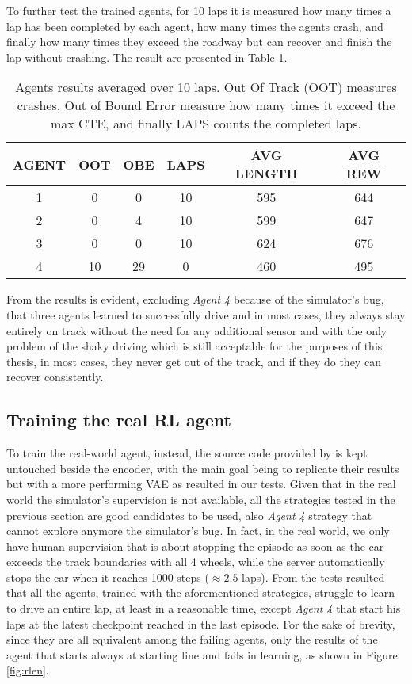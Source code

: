 To further test the trained agents, for 10 laps it is measured how many times a lap has been completed by each agent, how many times the agents crash, and finally how many times they exceed the roadway but can recover and finish the lap without crashing. The result are presented in Table \ref{tab:simagent}.
\begin{table}
  \centering
  \begin{tabular}{|c|c|c|c|c|c|}
  \hline
  AGENT & OOT & OBE & LAPS & AVG LENGTH & AVG REW \\ \hline
  1 & 0 & 0 & 10 & 595 & 644 \\
  2 & 0 & 4 & 10 & 599 & 647  \\ \hline
  3 & 0 & 0 & 10 & 624 & 676 \\
  4 & 10 & 29 & 0 & 460 & 495  \\ \hline
  \end{tabular}
  \caption{Agents results averaged over 10 laps. Out Of Track (OOT) measures crashes, Out of Bound Error measure how many times it exceed the max CTE, and finally LAPS counts the completed laps.}
  \label{tab:simagent}
\end{table}
From the results is evident, excluding \textit{Agent 4} because of the simulator's bug, that three agents learned to successfully drive and in most cases, they always stay entirely on track without the need for any additional sensor and with the only problem of the shaky driving which is still acceptable for the purposes of this thesis, in most cases, they never get out of the track, and if they do they can recover consistently.

\subsection{Training the real RL agent}
To train the real-world agent, instead, the source code provided by \citet{learning-to-drive-in-5-minutes} is kept untouched beside the encoder, with the main goal being to replicate their results but with a more performing VAE as resulted in our tests. Given that in the real world the simulator's supervision is not available, all the strategies tested in the previous section are good candidates to be used, also \textit{Agent 4} strategy that cannot explore anymore the simulator's bug. In fact, in the real world, we only have human supervision that is about stopping the episode as soon as the car exceeds the track boundaries with all 4 wheels, while the server automatically stops the car when it reaches 1000 steps ($\approx 2.5$ laps). From the tests resulted that all the agents, trained with the aforementioned strategies, struggle to learn to drive an entire lap, at least in a reasonable time, except\textit{ Agent 4 }that start his laps at the latest checkpoint reached in the last episode. For the sake of brevity, since they are all equivalent among the failing agents, only the results of the agent that starts always at starting line and fails in learning, as shown in Figure \ref{fig:rlen}.

